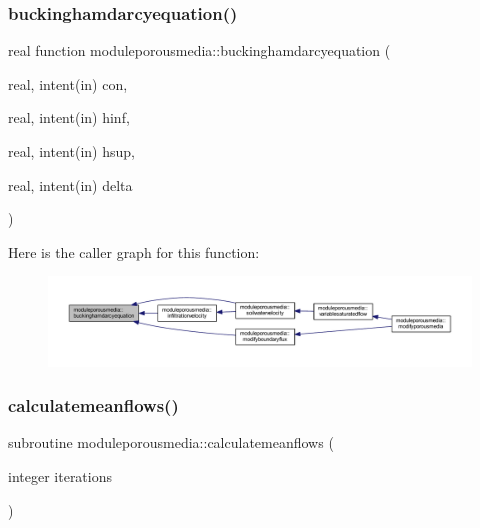\subsubsection{\texorpdfstring{buckinghamdarcyequation()}{buckinghamdarcyequation()}}
{\footnotesize\ttfamily real function moduleporousmedia\+::buckinghamdarcyequation (\begin{DoxyParamCaption}\item[{real, intent(in)}]{con,  }\item[{real, intent(in)}]{hinf,  }\item[{real, intent(in)}]{hsup,  }\item[{real, intent(in)}]{delta }\end{DoxyParamCaption})\hspace{0.3cm}{\ttfamily [private]}}

Here is the caller graph for this function\+:\nopagebreak
\begin{figure}[H]
\begin{center}
\leavevmode
\includegraphics[width=350pt]{namespacemoduleporousmedia_a6c8a46ce1fd00d13bf974507ac525cb8_icgraph}
\end{center}
\end{figure}
\mbox{\label{namespacemoduleporousmedia_a25f85d61b730aa85aca7f9dded8b38b5}} 
\subsubsection{\texorpdfstring{calculatemeanflows()}{calculatemeanflows()}}
{\footnotesize\ttfamily subroutine moduleporousmedia\+::calculatemeanflows (\begin{DoxyParamCaption}\item[{integer}]{iterations }\end{DoxyParamCaption})\hspace{0.3cm}{\ttfamily [private]}}

